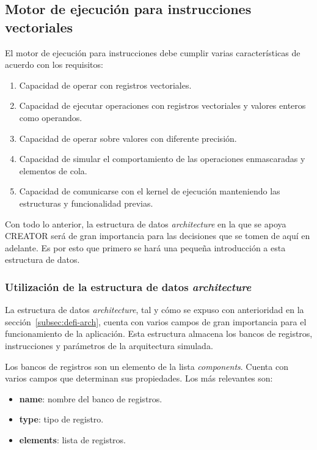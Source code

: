 \subsection{Motor de ejecución para instrucciones vectoriales}\label{sec:motor}

El motor de ejecución para instrucciones debe cumplir varias características de acuerdo con los requisitos:

\begin{enumerate}
\item Capacidad de operar con registros vectoriales.
\item Capacidad de ejecutar operaciones con registros vectoriales y valores enteros como operandos.
\item Capacidad de operar sobre valores con diferente precisión.
\item Capacidad de simular el comportamiento de las operaciones enmascaradas y elementos de cola.
\item Capacidad de comunicarse con el kernel de ejecución manteniendo las estructuras y funcionalidad previas.
\end{enumerate}

Con todo lo anterior, la estructura de datos \textit{architecture} en la que se apoya CREATOR será de gran importancia para las decisiones que se tomen de aquí en adelante. Es por esto que primero se hará una pequeña introducción a esta estructura de datos.

\subsubsection{Utilización de la estructura de datos \textit{architecture}}

La estructura de datos \textit{architecture}, tal y cómo se expuso con
anterioridad en la sección~\ref{subsec:defi-arch}, cuenta con varios campos de gran importancia para el
funcionamiento de la aplicación. Esta estructura almacena los bancos de
registros, instrucciones y parámetros de la arquitectura simulada.

Los bancos de registros son un elemento de la lista \textit{components}. Cuenta con varios campos que determinan sus propiedades. Los más relevantes son:
\begin{itemize}
\item \textbf{name}: nombre del banco de registros.
\item \textbf{type}: tipo de registro.
\item \textbf{elements}: lista de registros.
\end{itemize}

